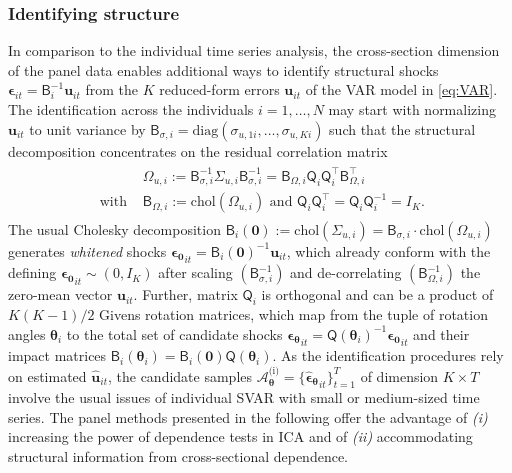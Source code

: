 \subsubsection{Identifying structure}
In comparison to the individual time series analysis, the cross-section dimension of the panel data enables additional ways to identify structural shocks $ \boldsymbol{\epsilon}_{it} = \mathsf{B}_i^{-1} \boldsymbol{u}_{it} $ from the $ K $ reduced-form errors $ \boldsymbol{u}_{it} $ of the VAR model in \eqref{eq:VAR}. The identification across the individuals $ i=1,\ldots,N $ may start with normalizing $ \boldsymbol{u}_{it} $ to unit variance by $ \mathsf{B}_{\sigma,i} = \text{diag}\left( \sigma_{u,1i}, \ldots, \sigma_{u,Ki} \right) $ such that the structural decomposition concentrates on the residual correlation matrix
\begin{align}
\begin{split}
	&\Omega_{u,i} := \mathsf{B}_{\sigma,i}^{-1} \Sigma^{\ }_{u,i} \mathsf{B}_{\sigma,i}^{-1} = \mathsf{B}_{\Omega,i}^{\ } \mathsf{Q}_i^{\ } \mathsf{Q}_i^\top \mathsf{B}_{\Omega,i}^\top \\
	\text{ with } & \mathsf{B}_{\Omega,i} := \text{chol}\left( \Omega_{u,i} \right) \text{ and } \mathsf{Q}_i^{\ } \mathsf{Q}_i^\top = \mathsf{Q}_i^{\ } \mathsf{Q}_i^{-1} = I_K.
\end{split}
\end{align}
The usual Cholesky decomposition $ \mathsf{B}_{i} \left( \boldsymbol{0} \right) := \text{chol}\left( \Sigma_{u,i} \right) = \mathsf{B}_{\sigma,i} \cdot \text{chol}\left( \Omega_{u,i} \right) $ generates \textit{whitened} shocks $ \boldsymbol{\epsilon_0}_{it} = \mathsf{B}_i \left( \boldsymbol{0} \right)^{-1} \boldsymbol{u}_{it} $, which already conform with the defining $ \boldsymbol{\epsilon_0}_{it} \sim ( 0, I_K ) $ after scaling $ \left( \mathsf{B}_{\sigma,i}^{-1} \right) $ and de-correlating $ \left( \mathsf{B}_{\Omega,i}^{-1} \right) $ the zero-mean vector $ \boldsymbol{u}_{it} $. Further, matrix $ \mathsf{Q}_i $ is orthogonal and can be a product of $ K(K-1)/2 $ Givens rotation matrices, which map from the tuple of rotation angles $ \boldsymbol{\theta}_i $ to the total set of candidate shocks $ \boldsymbol{\epsilon_\theta}_{it} = \mathsf{Q} \left( \boldsymbol{\theta}_i \right)^{-1} \boldsymbol{\epsilon_0}_{it} $ and their impact matrices $ \mathsf{B}_i \left( \boldsymbol{\theta}_i \right) = \mathsf{B}_{i} \left( \boldsymbol{0} \right) \mathsf{Q} \left( \boldsymbol{\theta}_i \right) $. As the identification procedures rely on estimated $ \boldsymbol{\widehat{u}}_{it} $, the candidate samples $ \mathcal{A}_{\boldsymbol{\theta}}^{\text{(i)}} = \{ \boldsymbol{\widehat{\epsilon}_\theta}_{it} \}^T_{t=1} $ of dimension $ K \times T $ involve the usual issues of individual SVAR with small or medium-sized time series. The panel methods presented in the following offer the advantage of \textit{(i)} increasing the power of dependence tests in ICA and of \textit{(ii)} accommodating structural information from cross-sectional dependence.
